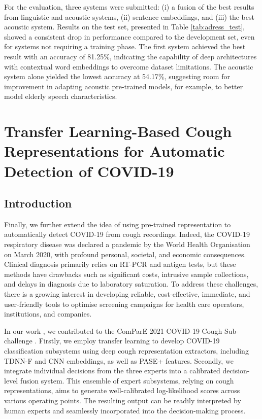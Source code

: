   For the evaluation, three systems were submitted: (i) a fusion of the best results from linguistic and acoustic systems, (ii) sentence embeddings, and (iii) the best acoustic system. Results on the test set, presented in Table \ref{tab:adress_test}, showed a consistent drop in performance compared to the development set, even for systems not requiring a training phase. The first system achieved the best result with an accuracy of 81.25\%, indicating the capability of deep architectures with contextual word embeddings to overcome dataset limitations. The acoustic system alone yielded the lowest accuracy at 54.17\%, suggesting room for improvement in adapting acoustic pre-trained models, for example, to better model elderly speech characteristics.



\section{Transfer Learning-Based Cough Representations for Automatic Detection of COVID-19}
\subsection{Introduction}
Finally, we further extend the idea of using pre-trained representation to automatically detect COVID-19 from cough recordings. Indeed, the COVID-19 respiratory disease was declared a pandemic by the World Health Organisation on March 2020, with profound personal, societal, and economic consequences. Clinical diagnosis primarily relies on RT-PCR and antigen tests, but these methods have drawbacks such as significant costs, intrusive sample collections, and delays in diagnosis due to laboratory saturation. To address these challenges, there is a growing interest in developing reliable, cost-effective, immediate, and user-friendly tools to optimise screening campaigns for health care operators, institutions, and companies.

In our work \cite{SoleraUrea2021TransferLC}, we contributed to the ComParE 2021 COVID-19 Cough Sub-challenge \cite{schuller21_interspeech}. Firstly, we employ transfer learning to develop COVID-19 classification subsystems using deep cough representation extractors, including \ac{TDNN-F} and \ac{CNN} embeddings, as well as PASE+ features. Secondly, we integrate individual decisions from the three experts into a calibrated decision-level fusion system. This ensemble of expert subsystems, relying on cough representations, aims to generate well-calibrated log-likelihood scores across various operating points. The resulting output can be readily interpreted by human experts and seamlessly incorporated into the decision-making process.

